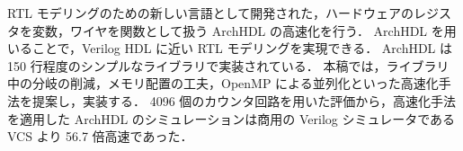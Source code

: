 RTL モデリングのための新しい言語として開発された，ハードウェアのレジスタを変数，ワイヤを関数として扱う ArchHDL の高速化を行う．
ArchHDL を用いることで，Verilog HDL に近い RTL モデリングを実現できる．
ArchHDL は 150 行程度のシンプルなライブラリで実装されている．
本稿では，ライブラリ中の分岐の削減，メモリ配置の工夫，OpenMP による並列化といった高速化手法を提案し，実装する．
4096 個のカウンタ回路を用いた評価から，高速化手法を適用した ArchHDL のシミュレーションは商用の Verilog シミュレータである VCS より 56.7 倍高速であった．
